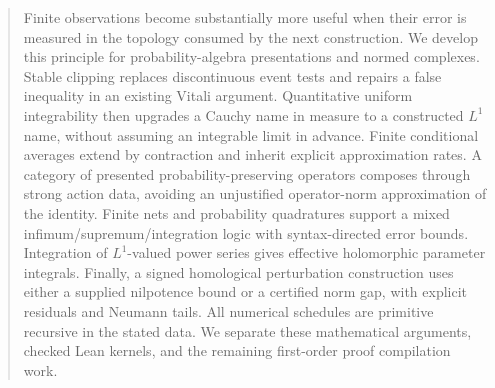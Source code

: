 \documentclass[11pt,a4paper]{article}
\theoremstyle{definition}
\theoremstyle{remark}
\begin{document}
\begin{abstract}
Finite observations become substantially more useful when their error is
measured in the topology consumed by the next construction. We develop this
principle for probability-algebra presentations and normed complexes. Stable
clipping replaces discontinuous event tests and repairs a false inequality in
an existing Vitali argument. Quantitative uniform integrability then upgrades
a Cauchy name in measure to a constructed $L^1$ name, without assuming an
integrable limit in advance. Finite conditional averages extend by contraction
and inherit explicit approximation rates. A category of presented
probability-preserving operators composes through strong action data, avoiding
an unjustified operator-norm approximation of the identity. Finite nets and
probability quadratures support a mixed infimum/supremum/integration logic with
syntax-directed error bounds. Integration of $L^1$-valued power series gives
effective holomorphic parameter integrals. Finally, a signed homological
perturbation construction uses either a supplied nilpotence bound or a
certified norm gap, with explicit residuals and Neumann tails. All numerical
schedules are primitive recursive in the stated data. We separate these
mathematical arguments, checked Lean kernels, and the remaining first-order
proof compilation work.
\end{abstract}
\tableofcontents
\clearpage










\end{document}
